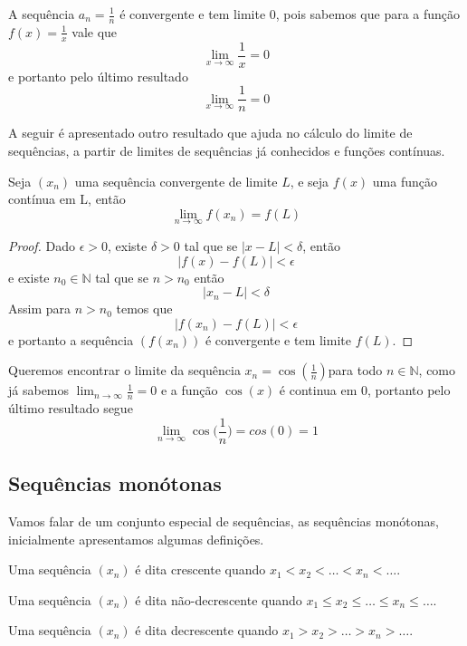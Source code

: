 \begin{ex}
    A sequência $a_n = \frac{1}{n}$ é convergente e tem limite $0$, pois sabemos
    que para a função $f(x) = \frac{1}{x}$ vale que    
    $$\lim_{x \to \infty} \frac{1}{x} = 0$$
    e portanto pelo último resultado
    $$\lim_{x \to \infty} \frac{1}{n} = 0$$
\end{ex}

A seguir é apresentado outro resultado que ajuda no cálculo do limite de 
sequências, a partir de limites de sequências já conhecidos e funções contínuas.

\begin{teo}
    Seja $(x_n)$ uma sequência convergente de limite $L$, e seja $f(x)$ uma função
    contínua em L, então
    $$\lim_{n \to \infty} f(x_n) = f(L)$$
\end{teo}


\begin{proof}
    Dado $\epsilon>0$, existe $\delta > 0$ tal que se $|x - L|< \delta$, então
    $$|f(x)-f(L)| < \epsilon $$
    e existe $n_0 \in \mathbb{N}$ tal que se $n>n_0$ então
    $$|x_n - L|< \delta$$
    Assim para $n>n_0$ temos que
    $$|f(x_n)-f(L)| < \epsilon $$
    e portanto a sequência $(f(x_n))$ é convergente e tem limite $f(L)$.
\end{proof}

\begin{ex}
    Queremos encontrar o limite da sequência $x_n = \cos(\frac{1}{n})$para todo
    $n \in \mathbb{N}$, como já sabemos $\lim_{n \to \infty} \frac{1}{n} = 0$ e 
    a função $\cos(x)$ é continua em $0$, portanto pelo último resultado segue
    $$\lim_{n \to \infty} \cos\bigg(\frac{1}{n}\bigg) = cos(0) = 1$$
\end{ex}

\subsection{Sequências monótonas}

Vamos falar de um conjunto especial de sequências, as sequências monótonas, 
inicialmente apresentamos algumas definições.

Uma sequência $(x_n)$ é dita crescente quando $x_1 < x_2 < \dots < x_n < \dots$.

Uma sequência $(x_n)$ é dita não-decrescente quando $x_1 \leq x_2 \leq \dots 
\leq x_n \leq \dots$.

Uma sequência $(x_n)$ é dita decrescente quando $x_1 > x_2 > \dots > x_n > \dots$.

